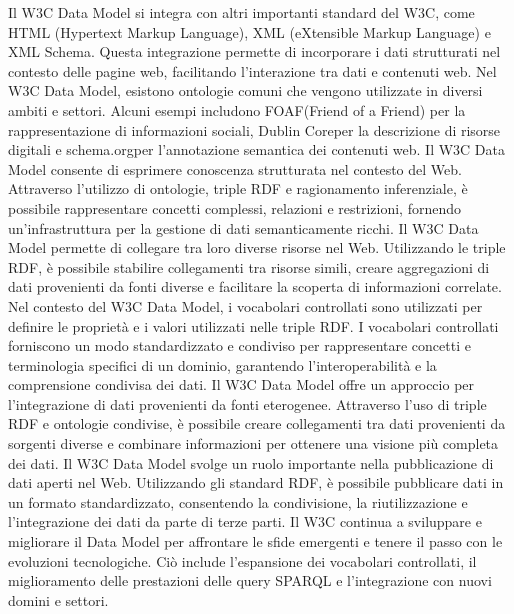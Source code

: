 Il W3C Data Model si integra con altri importanti standard del W3C, come HTML (Hypertext Markup Language), XML (eXtensible Markup Language) e XML Schema. Questa integrazione permette di incorporare i dati strutturati nel contesto delle pagine web, facilitando l'interazione tra dati e contenuti web.
Nel W3C Data Model, esistono ontologie comuni che vengono utilizzate in diversi ambiti e settori. Alcuni esempi includono FOAF\glo (Friend of a Friend) per la rappresentazione di informazioni sociali, Dublin Core\glo per la descrizione di risorse digitali e schema.org\glo per l'annotazione semantica dei contenuti web.
Il W3C Data Model consente di esprimere conoscenza strutturata nel contesto del Web. Attraverso l'utilizzo di ontologie, triple RDF e ragionamento inferenziale, è possibile rappresentare concetti complessi, relazioni e restrizioni, fornendo un'infrastruttura per la gestione di dati semanticamente ricchi.
Il W3C Data Model permette di collegare tra loro diverse risorse nel Web. Utilizzando le triple RDF, è possibile stabilire collegamenti tra risorse simili, creare aggregazioni di dati provenienti da fonti diverse e facilitare la scoperta di informazioni correlate.
Nel contesto del W3C Data Model, i vocabolari controllati sono utilizzati per definire le proprietà e i valori utilizzati nelle triple RDF. I vocabolari controllati forniscono un modo standardizzato e condiviso per rappresentare concetti e terminologia specifici di un dominio, garantendo l'interoperabilità e la comprensione condivisa dei dati.
Il W3C Data Model offre un approccio per l'integrazione di dati provenienti da fonti eterogenee. Attraverso l'uso di triple RDF e ontologie condivise, è possibile creare collegamenti tra dati provenienti da sorgenti diverse e combinare informazioni per ottenere una visione più completa dei dati.
Il W3C Data Model svolge un ruolo importante nella pubblicazione di dati aperti nel Web. Utilizzando gli standard RDF, è possibile pubblicare dati in un formato standardizzato, consentendo la condivisione, la riutilizzazione e l'integrazione dei dati da parte di terze parti.
Il W3C continua a sviluppare e migliorare il Data Model per affrontare le sfide emergenti e tenere il passo con le evoluzioni tecnologiche. Ciò include l'espansione dei vocabolari controllati, il miglioramento delle prestazioni delle query SPARQL e l'integrazione con nuovi domini e settori.\\

